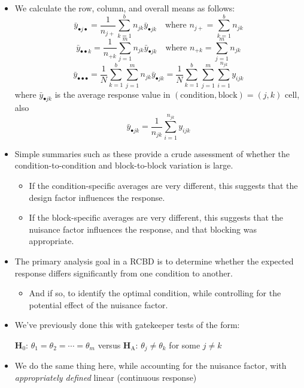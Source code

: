 \begin{itemize}
\begin{itemize}
          \end{itemize}
    \item We calculate the row, column, and overall means as follows:
          \[ \bar{y}_{\bullet j\bullet}=\frac{1}{n_{j+}} \sum_{k=1}^{b} n_{jk}\bar{y}_{\bullet jk}\quad\text{where }n_{j+}=\sum_{k=1}^{b} n_{jk} \]
          \[ \bar{y}_{\bullet\bullet k}=\frac{1}{n_{+k}} \sum_{j=1}^{m} n_{jk}\bar{y}_{\bullet jk}\quad\text{where }n_{+k}=\sum_{j=1}^{m} n_{jk} \]
          \[ \bar{y}_{\bullet\bullet\bullet}=\frac{1}{N} \sum_{k=1}^{b} \sum_{j=1}^{m} n_{jk}\bar{y}_{\bullet jk}=\frac{1}{N} \sum_{k=1}^{b} \sum_{j=1}^{m} \sum_{i=1}^{n_{jk}} y_{ijk} \]
          where $ \bar{y}_{\bullet jk} $ is the average response value in $  (\text{condition}, \text{block}) = (j, k) $ cell, also
          \[ \bar{y}_{\bullet jk}=\frac{1}{n_{jk}} \sum_{i=1}^{n_{jk}} y_{ijk} \]
    \item Simple summaries such as these provide a crude assessment of whether the condition-to-condition and
          block-to-block variation is large.
          \begin{itemize}
              \item If the condition-specific averages are very different, this suggests that the design factor influences the response.
              \item If the block-specific averages are very different, this suggests that the nuisance factor influences the response, and that blocking was appropriate.
          \end{itemize}
    \item The primary analysis goal in a RCBD is to determine whether the expected response differs significantly
          from one condition to another.
          \begin{itemize}
              \item And if so, to identify the optimal condition, while controlling for the potential effect of the nuisance factor.
          \end{itemize}
    \item We've previously done this with gatekeeper tests of the form:
          \begin{tightcenter}
              $ \mathbf{H}_0 $: $ \theta_1=\theta_2=\cdots=\theta_m $ versus $ \mathbf{H}_\text{A} $: $ \theta_j\ne \theta_k $ for some $ j\ne k $
          \end{tightcenter}
    \item We do the same thing here, while accounting for the nuisance factor, with \emph{appropriately defined} linear (continuous response)

\end{itemize}
